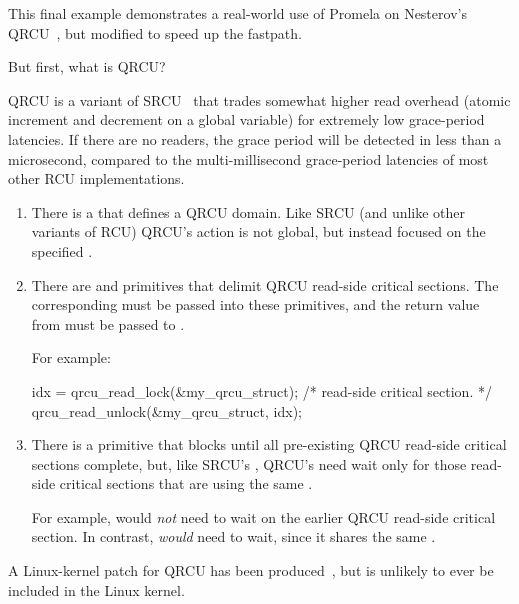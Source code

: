 This final example demonstrates a real-world use of Promela on 
{Nesterov}'s
QRCU~\cite{OlegNesterov2006QRCU,OlegNesterov2006aQRCU},
but modified to speed up the 
fastpath.

But first, what is QRCU?

QRCU is a variant of SRCU~\cite{PaulEMcKenney2006c}
that trades somewhat higher read overhead
(atomic increment and decrement on a global variable) for extremely
low grace-period latencies.
If there are no readers, the grace period will be detected in less
than a microsecond, compared to the multi-millisecond grace-period
latencies of most other RCU implementations.

\begin{enumerate}
\item	There is a  that defines a QRCU domain.
	Like SRCU (and unlike other variants of RCU) QRCU's action
	is not global, but instead focused on the specified
	.
\item	There are  and 
	primitives that delimit QRCU read-side critical sections.
	The corresponding  must be passed into
	these primitives, and the return value from 
	must be passed to .

	For example:

\begin{VerbatimU}
idx = qrcu_read_lock(&my_qrcu_struct);
/* read-side critical section. */
qrcu_read_unlock(&my_qrcu_struct, idx);
\end{VerbatimU}

\item	There is a  primitive that blocks until
	all pre-existing QRCU read-side critical sections complete,
	but, like SRCU's , QRCU's
	 need wait only for those read-side
	critical sections that are using the same .

	For example, 
	would \emph{not} need to wait on the earlier QRCU read-side
	critical section.
	In contrast, 
	\emph{would} need to wait, since it shares the same
	.
\end{enumerate}

A Linux-kernel patch for QRCU has been
produced~\cite{PaulMcKenney2007QRCUpatch},
but is unlikely to ever be included in the Linux kernel.

